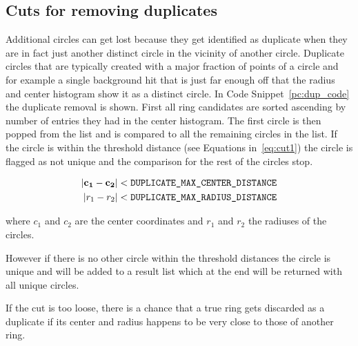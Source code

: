 \documentclass[11pt]{scrreprt}
\begin{document}

\subsection{Cuts for removing duplicates} %
\label{sub:different_cuts_for_circle_selection}

Additional circles can get lost because they get identified as duplicate when they are in fact just another distinct circle in 
the vicinity of another circle. Duplicate circles that are typically created with a major fraction of points of a circle and for 
example a single background hit that is just far enough off that the radius and center histogram show it as a distinct circle. 
In Code Snippet~\ref{pc:dup_code} the duplicate removal is shown. First all ring candidates are sorted ascending by number of 
entries they had in the center histogram. The first circle is then popped from the list and is compared to all the remaining circles 
in the list. If the circle is within the threshold distance (see Equations in~\ref{eq:cut1}) the circle is flagged as not unique and 
the comparison for the rest of the circles stop. 

\begin{equation}
\begin{aligned}
\left|\mathbf{c_1}-\mathbf{c_2}\right| &< \text{\texttt{DUPLICATE\_MAX\_CENTER\_DISTANCE}}\\
\left|r_1 - r_2\right| &< \text{\texttt{DUPLICATE\_MAX\_RADIUS\_DISTANCE}}
\end{aligned}
\label{eq:cut1}
\end{equation}

where $c_1$ and $c_2$ are the center coordinates and $r_1$ and $r_2$ the radiuses of the circles.

However if there is no other circle within the threshold distances the circle is unique and will be added to a result list which 
at the end will be returned with all unique circles. 

If the cut is too loose, there is a chance that a true ring gets discarded as a duplicate if its center and radius happens to be very 
close to those of another ring.
\end{document}
